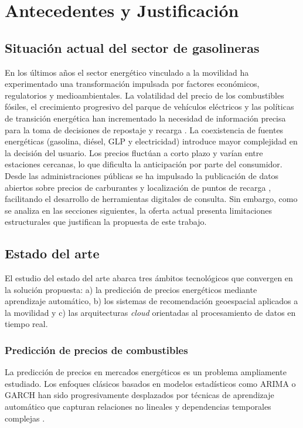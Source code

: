 \chapter{Antecedentes y Justificación}

\section{Situación actual del sector de gasolineras}

En los últimos años el sector energético vinculado a la movilidad ha experimentado una
transformación impulsada por factores económicos, regulatorios y medioambientales. La
volatilidad del precio de los combustibles fósiles, el crecimiento progresivo del parque de
vehículos eléctricos y las políticas de transición energética han incrementado la necesidad
de información precisa para la toma de decisiones de repostaje y recarga
\cite{expansion_motor_2026_01_12}.
La coexistencia de fuentes energéticas (gasolina, diésel, GLP y electricidad) introduce mayor complejidad en la decisión del usuario.
Los precios fluctúan a corto plazo y varían entre estaciones cercanas, lo que dificulta la anticipación por parte del consumidor. Desde las
administraciones públicas se ha impulsado la publicación de datos abiertos sobre precios
de carburantes y localización de puntos de recarga \cite{datosgob_carburantes,
  geoportal_gasolineras}, facilitando el desarrollo de herramientas digitales de consulta.
Sin embargo, como se analiza en las secciones siguientes, la oferta actual presenta
limitaciones estructurales que justifican la propuesta de este trabajo.

\section{Estado del arte}

El estudio del estado del arte abarca tres ámbitos tecnológicos que convergen en la
solución propuesta: a) la predicción de precios energéticos mediante aprendizaje automático,
b) los sistemas de recomendación geoespacial aplicados a la movilidad y c) las arquitecturas
\textit{cloud} orientadas al procesamiento de datos en tiempo real.

\subsection{Predicción de precios de combustibles}

La predicción de precios en mercados energéticos es un problema ampliamente estudiado.
Los enfoques clásicos basados en modelos estadísticos como ARIMA o GARCH han sido
progresivamente desplazados por técnicas de aprendizaje automático que capturan
relaciones no lineales y dependencias temporales complejas \cite{8945584}.

